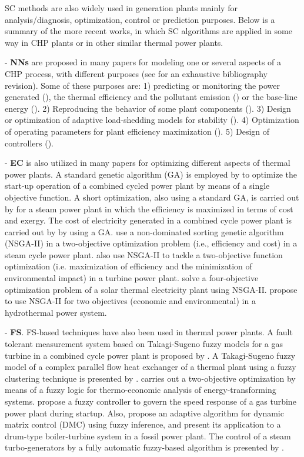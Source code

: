 SC methods are also widely used in generation plants mainly for analysis/diagnosis, optimization, control or prediction purposes. Below is a summary of the more recent works, in which SC algorithms are applied in some way in CHP plants or in other similar thermal power plants.

- \textbf{NNs} are proposed in many papers for modeling one or several aspects of a CHP process, with different purposes  (see \cite{Rossi-2014} for an exhaustive bibliography revision). Some of these purposes are: 1) predicting or monitoring the power generated (\cite{De-2007,Smrekar-2010,Nikpey-2013,Sisworahardjo-2013}), the thermal efficiency and the pollutant emission (\cite{Flynn-2005,Pan-2007}) or the base-line energy (\cite{Rossi-2014}). 2) Reproducing the behavior of some plant components (\cite{Bekat-2012}). 3) Design or optimization of adaptive load-shedding models for stability (\cite{Kumar-2013}). 4) Optimization of operating parameters for plant efficiency maximization (\cite{Zomo-2011,Arslam-2011}). 5) Design of controllers (\cite{Wang-2008,Lee-2010}).

- \textbf{EC} is also utilized in many papers for optimizing different aspects of thermal power plants. A standard genetic algorithm (GA) is employed by \cite{Bertini-12} to optimize the start-up operation of a combined cycled power plant by means of a single objective function. A short optimization, also using a standard GA, is carried out by \cite{Ameri-09} for a steam power plant in which the efficiency is maximized in terms of cost and exergy. The cost of electricity generated in a combined cycle power plant is carried out by \cite{Koch-2007} by using a GA. \cite{Haja-2012} use a non-dominated sorting genetic algorithm (NSGA-II) in a two-objective optimization problem (i.e., efficiency and cost) in a steam cycle power plant. \cite{Ahmadi-2011} also use NSGA-II to tackle a two-objective function optimization (i.e. maximization of efficiency and the minimization of environmental impact) in a turbine power plant. \cite{Deb2012} solve a four-objective optimization problem of a solar thermal electricity plant using NSGA-II. \cite{Basu-11} propose to use NSGA-II for two objectives (economic and environmental) in a hydrothermal power system. 

- \textbf{FS}. FS-based techniques have also been used in thermal power plants. A fault tolerant measurement system based on Takagi-Sugeno fuzzy models for a gas turbine in a combined cycle power plant is proposed by \cite{Berrios-2011}. A Takagi-Sugeno fuzzy model of a complex parallel flow heat exchanger of a thermal plant using a fuzzy clustering technique is presented by \cite{Habi-2011}. \cite{Mazur-2009} carries out a two-objective optimization by means of a fuzzy logic for thermo-economic analysis of energy-transforming systems. \cite{Rodriguez-Martinez-2011} propose a fuzzy controller to govern the speed response of a gas turbine power plant during startup. Also, \cite{Moon-2011} propose an adaptive algorithm for dynamic matrix control (DMC) using fuzzy inference, and present its application to a drum-type boiler-turbine system in a fossil power plant. The control of a steam turbo-generators by a fully automatic fuzzy-based algorithm is presented by \cite{Gunes-2010}.

